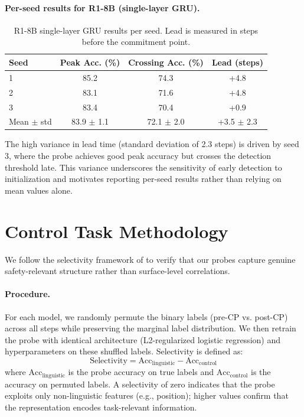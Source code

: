 \paragraph{Per-seed results for R1-8B (single-layer GRU).}

\begin{table}[h]
\centering
\small
\caption{R1-8B single-layer GRU results per seed. Lead is measured in steps before the commitment point.}
\label{tab:gru_seeds}
\begin{tabular}{lccc}
\toprule
Seed & Peak Acc. (\%) & Crossing Acc. (\%) & Lead (steps) \\
\midrule
1 & 85.2 & 74.3 & +4.8 \\
2 & 83.1 & 71.6 & +4.8 \\
3 & 83.4 & 70.4 & +0.9 \\
\midrule
Mean $\pm$ std & 83.9 $\pm$ 1.1 & 72.1 $\pm$ 2.0 & +3.5 $\pm$ 2.3 \\
\bottomrule
\end{tabular}
\end{table}

The high variance in lead time (standard deviation of 2.3 steps) is driven by seed 3, where the probe achieves good peak accuracy but crosses the detection threshold late. This variance underscores the sensitivity of early detection to initialization and motivates reporting per-seed results rather than relying on mean values alone.


\section{Control Task Methodology}
\label{app:control}

We follow the selectivity framework of \cite{hewitt2019control} to verify that our probes capture genuine safety-relevant structure rather than surface-level correlations.

\paragraph{Procedure.} For each model, we randomly permute the binary labels (pre-CP vs. post-CP) across all steps while preserving the marginal label distribution. We then retrain the probe with identical architecture (L2-regularized logistic regression) and hyperparameters on these shuffled labels. Selectivity is defined as:
\begin{equation}
    \text{Selectivity} = \text{Acc}_{\text{linguistic}} - \text{Acc}_{\text{control}}
\end{equation}
where $\text{Acc}_{\text{linguistic}}$ is the probe accuracy on true labels and $\text{Acc}_{\text{control}}$ is the accuracy on permuted labels. A selectivity of zero indicates that the probe exploits only non-linguistic features (e.g., position); higher values confirm that the representation encodes task-relevant information.

